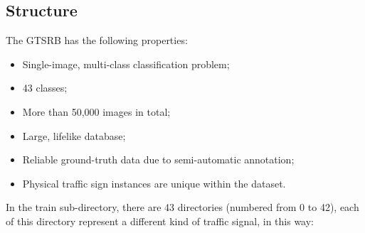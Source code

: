\subsection{Structure}
The GTSRB has the following properties:
\begin{itemize}
	\item Single-image, multi-class classification problem;
	\item 43 classes;
	\item More than 50,000 images in total;
	\item Large, lifelike database;
	\item Reliable ground-truth data due to semi-automatic annotation;
	\item Physical traffic sign instances are unique within the dataset.
\end{itemize}

In the train sub-directory, there are 43 directories (numbered from 0 to 42), each of this directory represent a different kind of traffic signal, in this way:

